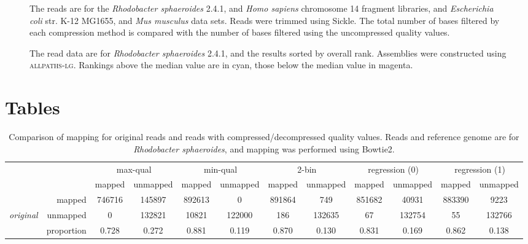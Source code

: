 \documentclass{bmcart}
\begin{document}
\begin{backmatter}
\begin{figure}[h!]
\caption{
  The reads are for the \textit{Rhodobacter sphaeroides} 2.4.1, and
  \textit{Homo sapiens} chromosome 14 fragment libraries, and
  \textit{Escherichia coli} str. K-12 MG1655, and \textit{Mus
    musculus} data sets. Reads were trimmed using Sickle. The total
  number of bases filtered by each compression method is compared with
  the number of bases filtered using the uncompressed quality values.}
  \label{fig:preprocessing}
\end{figure}

\begin{figure}[h!]
\caption{ The read data are for \textit{Rhodobacter
    sphaeroides} 2.4.1, and the results sorted by overall
  rank. Assemblies were constructed using \textsc{allpaths-lg}.
  Rankings above the median value are in cyan, those below the median
  value in magenta.}
  \label{fig:assembly_ranks}
\end{figure}



\section*{Tables}

\begin{table*}[!tbhp]
\caption{Comparison of mapping for original reads and reads with
  compressed/decompressed quality values. Reads and reference genome
  are for \textit{Rhodobacter sphaeroides}, and mapping was performed
  using Bowtie2.}
\begin{tiny}
\begin{tabular}{lr|cc|cc|cc|cc|cc}
 & & \multicolumn{2}{c|}{max-qual} & \multicolumn{2}{c|}{min-qual} & \multicolumn{2}{c|}{2-bin} & \multicolumn{2}{c|}{regression (0)} & \multicolumn{2}{c}{regression (1)} \\
& & mapped & unmapped & mapped & unmapped & mapped & unmapped & mapped & unmapped & mapped & unmapped \\
\cline{2-12}
& mapped & 746716 & 145897 & 892613 &   0 & 891864 & 749 & 851682 & 40931 & 883390 & 9223 \\
{\em original} & unmapped &   0 & 132821 & 10821 & 122000 & 186 & 132635 &  67 & 132754 &  55 & 132766 \\
\cline{2-12}
& proportion & 0.728 & 0.272 & 0.881 & 0.119 & 0.870 & 0.130 & 0.831 & 0.169 & 0.862 & 0.138 \\
\end{tabular}


\end{tiny}
\end{table*}
\end{backmatter}
\end{document}

